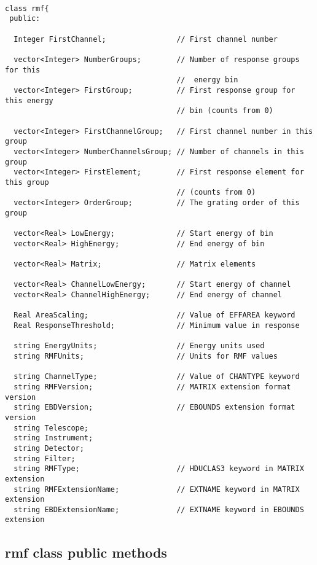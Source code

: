 \documentclass[11pt]{book}
\begin{document}
\begin{verbatim}

class rmf{
 public:

  Integer FirstChannel;                // First channel number 

  vector<Integer> NumberGroups;        // Number of response groups for this
                                       //  energy bin 
  vector<Integer> FirstGroup;          // First response group for this energy
                                       // bin (counts from 0)

  vector<Integer> FirstChannelGroup;   // First channel number in this group 
  vector<Integer> NumberChannelsGroup; // Number of channels in this group 
  vector<Integer> FirstElement;        // First response element for this group
                                       // (counts from 0)
  vector<Integer> OrderGroup;          // The grating order of this group 

  vector<Real> LowEnergy;              // Start energy of bin 
  vector<Real> HighEnergy;             // End energy of bin 

  vector<Real> Matrix;                 // Matrix elements 

  vector<Real> ChannelLowEnergy;       // Start energy of channel 
  vector<Real> ChannelHighEnergy;      // End energy of channel 

  Real AreaScaling;                    // Value of EFFAREA keyword 
  Real ResponseThreshold;              // Minimum value in response 

  string EnergyUnits;                  // Energy units used
  string RMFUnits;                     // Units for RMF values

  string ChannelType;                  // Value of CHANTYPE keyword 
  string RMFVersion;                   // MATRIX extension format version 
  string EBDVersion;                   // EBOUNDS extension format version 
  string Telescope;                             
  string Instrument;
  string Detector;
  string Filter;
  string RMFType;                      // HDUCLAS3 keyword in MATRIX extension 
  string RMFExtensionName;             // EXTNAME keyword in MATRIX extension 
  string EBDExtensionName;             // EXTNAME keyword in EBOUNDS extension 

\end{verbatim}

\subsection{rmf class public methods}
\end{document}
